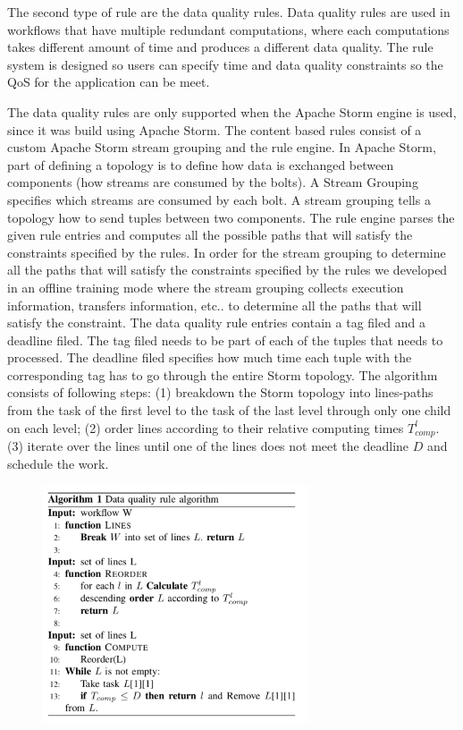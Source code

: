 The second type of rule are the data quality rules. Data quality rules are used in workflows that have multiple redundant computations, where each computations takes different amount of time and produces a different data quality. The rule system is designed so users can specify time and data quality constraints so the QoS for the application can be meet.

The data quality rules are only supported when the Apache Storm engine is used, since it was build using Apache Storm. The content based rules consist of a custom Apache Storm stream grouping and the rule engine. In Apache Storm, part of defining a topology is to define how data is exchanged between components (how streams are consumed by the bolts). A Stream Grouping specifies which streams are consumed by each bolt. A stream grouping tells a topology how to send tuples between two components. The rule engine parses the given rule entries and computes all the possible paths that will satisfy the constraints specified by the rules. In order for the stream grouping to determine all the paths that will satisfy the constraints specified by the rules we developed in an offline training mode where the stream grouping collects execution information, transfers information, etc.. to determine all the paths that will satisfy the constraint. The data quality rule entries contain a tag filed and a deadline filed. The tag filed needs to be part of each of the tuples that needs to processed. The deadline filed specifies how much time each tuple with the corresponding tag has to go through the entire Storm topology. The algorithm consists of following steps: (1) breakdown the Storm topology into lines-paths from the task of the first level to the task of the last level through only one child on each level; (2) order lines according to their relative computing times $T_{comp}^l$. (3) iterate over the lines until one of the lines does not meet the deadline $D$ and schedule the work.

\begin{figure}[h!]
  \centering
  \includegraphics[width=0.7\textwidth]{Figures/Algorithm.pdf}
  \label{fig:Algorithm}
\end{figure}

